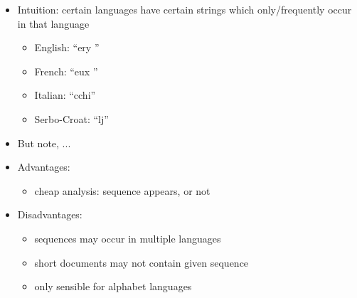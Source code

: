 \documentclass[a4paper,landscape,headrule,footrule,xetex]{foils}
\begin{document}

\begin{itemize}
\item Intuition: certain languages have certain strings which only/frequently occur in that language
\begin{itemize}
\item English: ``ery ''
\item French: ``eux ''
\item Italian: ``cchi''
\item Serbo-Croat: ``lj''
\end{itemize}
\item But note, ...

\newpage

\item Advantages:
  \begin{itemize}
  \item cheap analysis: sequence appears, or not
  \end{itemize}
\item Disadvantages:
  \begin{itemize}
  \item sequences may occur in multiple languages
  \item short documents may not contain given sequence
  \item only sensible for alphabet languages
  \end{itemize}
\end{itemize}




\end{document}
